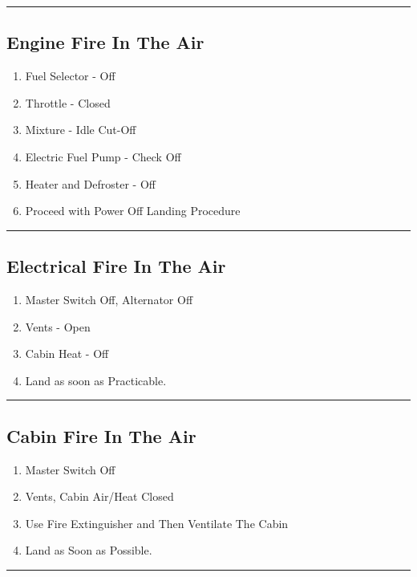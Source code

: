 \documentclass[a4paper]{article}
\newenvironment{numberedchecklist}{
  \begin{enumerate}[label=\arabic*., leftmargin=*, align=left]
    \setlength{\itemsep}{2pt}
    \setlength{\parskip}{0pt}
    \setlength{\parsep}{0pt}
}{
  \end{enumerate}
}
\begin{document}
\rule{\linewidth}{0.4pt}

\subsection*{Engine Fire In The Air}
\begin{numberedchecklist}
\item Fuel Selector - Off
\item Throttle - Closed
\item Mixture - Idle Cut-Off
\item Electric Fuel Pump - Check Off
\item Heater and Defroster - Off
\item Proceed with Power Off Landing Procedure
\end{numberedchecklist}

\rule{\linewidth}{0.4pt}

\subsection*{Electrical Fire In The Air}
\begin{numberedchecklist}
\item Master Switch Off, Alternator Off
\item Vents - Open
\item Cabin Heat - Off
\item Land as soon as Practicable.
\end{numberedchecklist}

\rule{\linewidth}{0.4pt}

\subsection*{Cabin Fire In The Air}
\begin{numberedchecklist}
\item Master Switch Off
\item Vents, Cabin Air/Heat Closed
\item Use Fire Extinguisher and Then Ventilate The Cabin
\item Land as Soon as Possible.
\end{numberedchecklist}

\rule{\linewidth}{0.4pt}
\end{document}
